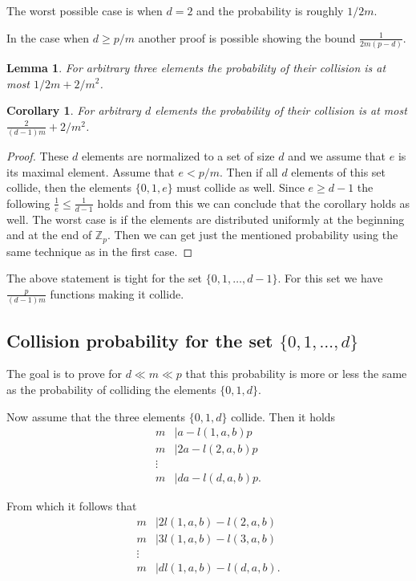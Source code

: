 \documentclass{article}
\newtheorem{lemma}{Lemma}
\newtheorem{corollary}{Corollary}
\begin{document}
The worst possible case is when $d = 2$ and the probability is roughly $1/2m$.

In the case when $d \geq p/m$ another proof is possible showing the bound $\frac{1}{2m(p - d)}$.

\begin{lemma}
\label{lm:three-elements}
For arbitrary three elements the probability of their collision is at most $1/2m + 2/m^2$.
\end{lemma}

\begin{corollary}
\label{co:d-elements}
For arbitrary $d$ elements the probability of their collision is at most $\frac{2}{(d - 1) m} + 2/m^2$.
\end{corollary}
\begin{proof}
These $d$ elements are normalized to a set of size $d$ and we assume that $e$ is its maximal element.
Assume that $e < p / m$. Then if all $d$ elements of this set collide, then the elements $\{0, 1, e\}$ must collide as well.
Since $e \geq d - 1$ the following $\frac{1}{e} \leq \frac{1}{d - 1}$ holds and from this we can conclude that the corollary holds as well.
The worst case is if the elements are distributed uniformly at the beginning and at the end of $\mathbb{Z}_p$.
Then we can get just the mentioned probability using the same technique as in the first case.
\end{proof}

The above statement is tight for the set $\{0, 1, \ldots, d - 1\}$.
For this set we have $\frac{p}{(d - 1)m}$ functions making it collide.

\subsection{Collision probability for the set $\{0, 1, \ldots, d\}$}

The goal is to prove for $d \ll m \ll p$ that this probability is more or less the same as the probability of colliding the elements $\{0, 1, d\}$.

Now assume that the three elements $\{0, 1, d\}$ collide.
Then it holds
\begin{align*}
m & \mid a - l(1, a, b)p \\
m & \mid 2a - l(2, a, b)p \\
\vdots & \\
m & \mid da - l(d, a, b)p.
\end{align*}

From which it follows that
\begin{align*}
m & \mid 2l(1, a, b) - l(2, a, b) \\
m & \mid 3l(1, a, b) - l(3, a, b) \\
\vdots & \\
m & \mid dl(1, a, b) - l(d, a, b).
\end{align*}
\end{document}
